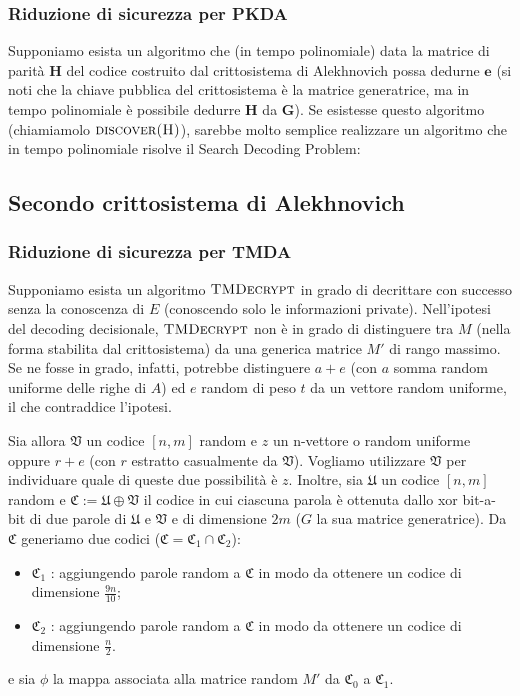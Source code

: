 \documentclass[12pt, a4paper]{report}
\theoremstyle{definition}
\begin{document}
				\subsubsection{Riduzione di sicurezza per PKDA}
				Supponiamo esista un algoritmo che (in tempo polinomiale) data la matrice di parità $\mathbf{H}$ del codice costruito dal crittosistema di Alekhnovich possa dedurne $\textbf{e}$ (si noti che la chiave pubblica del crittosistema è la matrice generatrice, ma in tempo polinomiale è possibile dedurre $\mathbf{H}$ da $\mathbf{G}$). Se esistesse questo algoritmo (chiamiamolo $\textsc{discover(H)}$), sarebbe molto semplice realizzare un algoritmo che in tempo polinomiale risolve il Search Decoding Problem:
				\algFive
			\subsection{Secondo crittosistema di Alekhnovich}
				\subsubsection{Riduzione di sicurezza per TMDA \cite{9}}
				Supponiamo esista un algoritmo $\textsc{TMDecrypt}$ in grado di decrittare con successo senza la conoscenza di $E$ (conoscendo solo le informazioni private). Nell'ipotesi del decoding decisionale, $\textsc{TMDecrypt}$ non è in grado di distinguere tra $M$ (nella forma stabilita dal crittosistema) da una generica matrice $M'$ di rango massimo. Se ne fosse in grado, infatti, potrebbe distinguere $a+e$ (con $a$ somma random uniforme delle righe di $A$) ed $e$ random di peso $t$ da un vettore random uniforme, il che contraddice l'ipotesi.
				
				Sia allora $\mathfrak{V}$ un codice $[n,m]$ random e $z$ un n-vettore o random uniforme oppure $r+e$ (con $r$ estratto casualmente da $\mathfrak{V}$). Vogliamo utilizzare $\mathfrak{V}$ per individuare quale di queste due possibilità è $z$. Inoltre, sia $\mathfrak{U}$ un codice $[n,m]$ random e $\mathfrak{C}:=\mathfrak{U}\oplus \mathfrak{V}$ il codice in cui ciascuna parola è ottenuta dallo xor bit-a-bit di due parole di $\mathfrak{U}$ e $\mathfrak{V}$ e di dimensione $2m$ ($G$ la sua matrice generatrice). Da $\mathfrak{C}$ generiamo due codici ($\mathfrak{C}=\mathfrak{C}_1 \cap \mathfrak{C}_2$):
				\begin{itemize}
					\item $\mathfrak{C}_1$ : aggiungendo parole random a $\mathfrak{C}$ in modo da ottenere un codice di dimensione $\frac{9n}{10}$;
					\item $\mathfrak{C}_2$ : aggiungendo parole random a $\mathfrak{C}$ in modo da ottenere un codice di dimensione $\frac{n}{2}$.
				\end{itemize}
				e sia $\phi$ la mappa associata alla matrice random $M'$ da $\mathfrak{C}_0$ a $\mathfrak{C}_1$.
				
\end{document}
